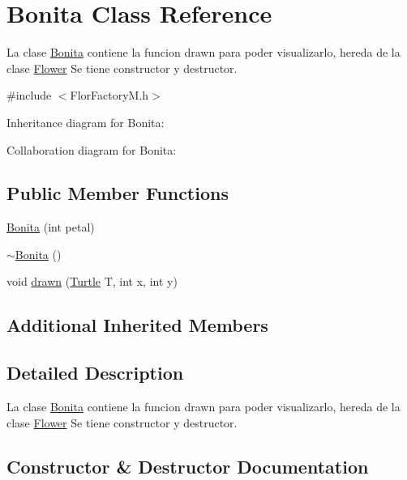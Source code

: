 \hypertarget{classBonita}{}\section{Bonita Class Reference}
\label{classBonita}


La clase \hyperlink{classBonita}{Bonita} contiene la funcion drawn para poder visualizarlo, hereda de la clase \hyperlink{classFlower}{Flower}  Se tiene constructor y destructor.  




{\ttfamily \#include $<$Flor\+Factory\+M.\+h$>$}



Inheritance diagram for Bonita\+:


Collaboration diagram for Bonita\+:
\subsection*{Public Member Functions}
\begin{DoxyCompactItemize}
\item 
\hyperlink{classBonita_a232a3a50b47b2bb3c1e7a3e5b1112243}{Bonita} (int petal)
\item 
\hyperlink{classBonita_a22bbc0d05b2e811ffa30ea73201eda07}{$\sim$\+Bonita} ()
\item 
void \hyperlink{classBonita_ae8b76e1290313f077869b2ea876cab7f}{drawn} (\hyperlink{classTurtle}{Turtle} T, int x, int y)
\end{DoxyCompactItemize}
\subsection*{Additional Inherited Members}


\subsection{Detailed Description}
La clase \hyperlink{classBonita}{Bonita} contiene la funcion drawn para poder visualizarlo, hereda de la clase \hyperlink{classFlower}{Flower}  Se tiene constructor y destructor. 

\subsection{Constructor \& Destructor Documentation}
\mbox{\label{classBonita_a232a3a50b47b2bb3c1e7a3e5b1112243}} 
